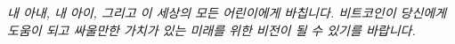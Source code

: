 
\newpage \vspace*{8cm}
\thispagestyle{empty}
\begin{center}
	\Large \emph{
		내 아내, 내 아이, 그리고 이 세상의 모든 어린이에게 바칩니다.
		비트코인이 당신에게 도움이 되고 싸울만한 가치가 있는 미래를 위한 비전이 될 수 있기를 바랍니다.
	}
\end{center}
